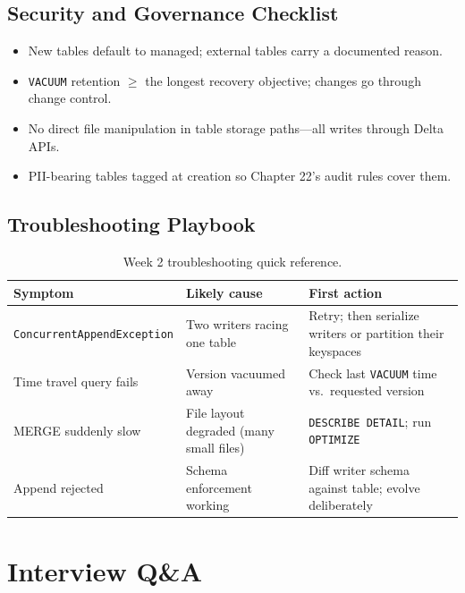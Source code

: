 \subsection{Security and Governance Checklist}
\begin{itemize}
    \item New tables default to managed; external tables carry a documented reason.
    \item \texttt{VACUUM} retention $\ge$ the longest recovery objective; changes go through change control.
    \item No direct file manipulation in table storage paths---all writes through Delta APIs.
    \item PII-bearing tables tagged at creation so Chapter 22's audit rules cover them.
\end{itemize}

\subsection{Troubleshooting Playbook}
\begin{table}[H]
\centering
\small
\begin{tabular}{@{}p{3.6cm}p{4.2cm}p{4.8cm}@{}}
\toprule
\textbf{Symptom} & \textbf{Likely cause} & \textbf{First action} \\
\midrule
\texttt{ConcurrentAppendException} & Two writers racing one table & Retry; then serialize writers or partition their keyspaces \\
Time travel query fails & Version vacuumed away & Check last \texttt{VACUUM} time vs.\ requested version \\
MERGE suddenly slow & File layout degraded (many small files) & \texttt{DESCRIBE DETAIL}; run \texttt{OPTIMIZE} \\
Append rejected & Schema enforcement working & Diff writer schema against table; evolve deliberately \\
\bottomrule
\end{tabular}
\caption{Week 2 troubleshooting quick reference.}
\label{tab:ch2-trouble}
\end{table}

\section{Interview Q\&A}
